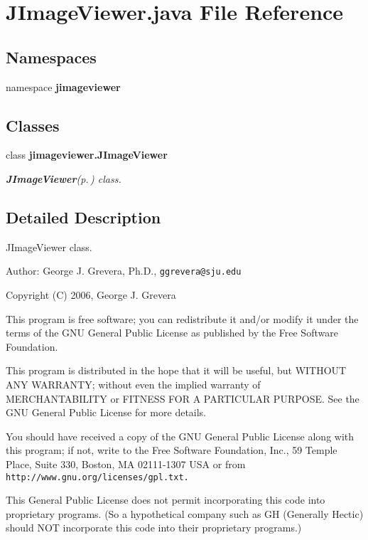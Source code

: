 \section{JImage\-Viewer.java File Reference}
\label{_j_image_viewer_8java}
\subsection*{Namespaces}
\begin{CompactItemize}
\item 
namespace {\bf jimageviewer}
\end{CompactItemize}
\subsection*{Classes}
\begin{CompactItemize}
\item 
class {\bf jimageviewer.JImage\-Viewer}
\begin{CompactList}\small\item\em {\bf JImage\-Viewer}{\rm (p.\,\pageref{classjimageviewer_1_1_j_image_viewer})} class. \item\end{CompactList}\end{CompactItemize}


\subsection{Detailed Description}
JImage\-Viewer class.

\begin{Desc}
\item[Author:]George J. Grevera, Ph.D., {\tt ggrevera@sju.edu}\end{Desc}
Copyright (C) 2006, George J. Grevera

This program is free software; you can redistribute it and/or modify it under the terms of the GNU General Public License as published by the Free Software Foundation.

This program is distributed in the hope that it will be useful, but WITHOUT ANY WARRANTY; without even the implied warranty of MERCHANTABILITY or FITNESS FOR A PARTICULAR PURPOSE. See the GNU General Public License for more details.

You should have received a copy of the GNU General Public License along with this program; if not, write to the Free Software Foundation, Inc., 59 Temple Place, Suite 330, Boston, MA 02111-1307 USA or from {\tt http://www.gnu.org/licenses/gpl.txt.}

This General Public License does not permit incorporating this code into proprietary programs. (So a hypothetical company such as GH (Generally Hectic) should NOT incorporate this code into their proprietary programs.) 